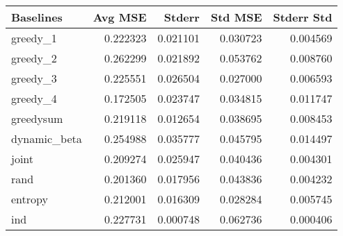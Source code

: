 \begin{tabular}{lrrrr}
\toprule
    Baselines &   Avg MSE &    Stderr &   Std MSE &  Stderr Std \\
\midrule
     greedy\_1 &  0.222323 &  0.021101 &  0.030723 &    0.004569 \\
     greedy\_2 &  0.262299 &  0.021892 &  0.053762 &    0.008760 \\
     greedy\_3 &  0.225551 &  0.026504 &  0.027000 &    0.006593 \\
     greedy\_4 &  0.172505 &  0.023747 &  0.034815 &    0.011747 \\
   greedysum &  0.219118 &  0.012654 &  0.038695 &    0.008453 \\
 dynamic\_beta &  0.254988 &  0.035777 &  0.045795 &    0.014497 \\
        joint &  0.209274 &  0.025947 &  0.040436 &    0.004301 \\
         rand &  0.201360 &  0.017956 &  0.043836 &    0.004232 \\
      entropy &  0.212001 &  0.016309 &  0.028284 &    0.005745 \\
          ind &  0.227731 &  0.000748 &  0.062736 &    0.000406 \\
\bottomrule
\end{tabular}
